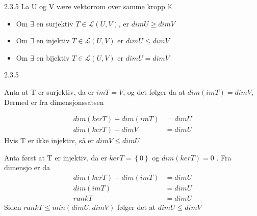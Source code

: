 \documentclass[a4paper,norsk]{article}
\renewcommand{\geq}{\geqslant}
\renewcommand{\leq}{\leqslant}
\begin{document}
\begin{propositionbox}{2.3.5}{}
La U og V være vektorrom over samme kropp $ \mathbb{K} $ 
\begin{itemize}
  \item Om $ \exists $ en surjektiv $ T \in \mathcal{L} \left( U, V \right)  $, er $ dim U \geq dim V $ 
  \item Om $ \exists  $ en injektiv $ T \in \mathcal{L} \left( U, V \right)  $ er $ dim U \leq dim V $ 
  \item Om $ \exists  $ en bijektiv $ T \in \mathcal{L} \left( U, V \right)  $  er $ dim U = dim V $ 
\end{itemize}

\begin{proofbox}{2.3.5}{}

Anta at T er surjektiv, da er $ im T = V $, og det følger da at $ dim \left( im T \right) = dim V $, Dermed er fra dimensjonssatsen

\begin{align*}
  dim \left( ker T \right) + dim \left( im T \right) &= dim U\\
  dim \left( ker T \right) + dim V &= dim U
\end{align*}
Hvis T er ikke injektiv, så er $ dim V \leq dim U $ 


Anta først at T er injektiv, da er $ ker T = \left\{ 0 \right\}  $ og $ dim \left( ker T  \right) = 0 $ . Fra dimensjo er da
\begin{align*}
  dim \left( ker T \right) + dim \left( im T \right) &= dim U  \\
  dim \left( im T \right) &= dim U \\
  rank T &= dim U
\end{align*}
Siden $ rank T \leq min \left( dim U, dim V \right)  $  følger det at $ dim U \leq dim V $ 
\end{proofbox}
\end{propositionbox}
\end{document}
